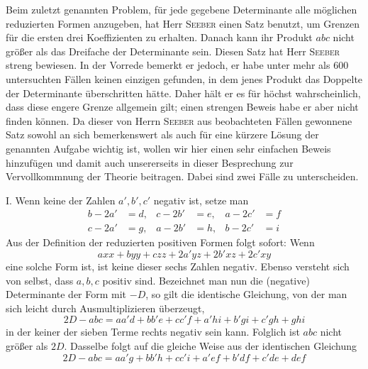Beim zuletzt genannten Problem, für jede gegebene Determinante alle möglichen reduzierten Formen anzugeben, hat Herr \textsc{Seeber} einen Satz benutzt, um Grenzen für die ersten drei Koeffizienten zu erhalten. Danach kann ihr Produkt $abc$ nicht größer als das Dreifache der Determinante sein. Diesen Satz hat Herr \textsc{Seeber} streng bewiesen. In der Vorrede bemerkt er jedoch, er habe unter mehr als 600 untersuchten Fällen keinen einzigen gefunden, in dem jenes Produkt das Doppelte der Determinante überschritten hätte. Daher hält er es für höchst wahrscheinlich, dass diese engere Grenze allgemein gilt; einen strengen Beweis habe er aber nicht finden können. Da dieser von Herrn \textsc{Seeber} aus beobachteten Fällen gewonnene Satz sowohl an sich bemerkenswert als auch für eine kürzere Lösung der genannten Aufgabe wichtig ist, wollen wir hier einen sehr einfachen Beweis hinzufügen und damit auch unsererseits in dieser Besprechung zur Vervollkommnung der Theorie beitragen. Dabei sind zwei Fälle zu unterscheiden.

\begingroup{} I. Wenn keine der Zahlen $a',b',c'$ negativ ist, setze man
\[
\begin{aligned}
b-2a'&=d,&c-2b'&=e,&a-2c'&=f\\
c-2a'&=g,&a-2b'&=h,&b-2c'&=i
\end{aligned}
\]
Aus der Definition der reduzierten positiven Formen folgt sofort: Wenn
\[
axx+byy+czz+2a'yz+2b'xz+2c'xy
\]
eine solche Form ist, ist keine dieser sechs Zahlen negativ. Ebenso versteht sich von selbst, dass $a,b,c$ positiv sind. Bezeichnet man nun die (negative)
Determinante der Form mit $-D$, so gilt die identische Gleichung, von der man sich leicht durch Ausmultiplizieren überzeugt,
\[
2D-abc=aa'd+bb'e+cc'f+a'hi+b'gi+c'gh+ghi
\]
in der keiner der sieben Terme rechts negativ sein kann. Folglich ist $abc$ nicht größer als $2D$. Dasselbe folgt auf die gleiche Weise aus der identischen Gleichung
\[
2D-abc=aa'g+bb'h+cc'i+a'ef+b'df+c'de+def
\]\endgroup

